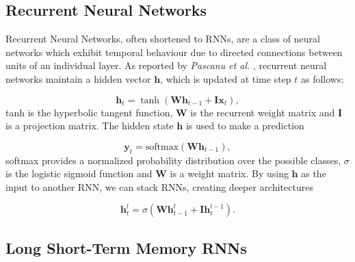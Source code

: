 \documentclass[article]{IEEEtran}
\begin{document}
\subsection{Recurrent Neural Networks}
\def\x{{\mathbf x}}
\def\L{{\cal L}}
Recurrent Neural Networks, often shortened to RNNs, are a class of neural networks which exhibit temporal behaviour due to directed connections between units of an individual layer. As reported by \textit{Pascanu et al.} \cite{pascanu2013construct}, recurrent neural networks maintain a hidden vector $\mathbf h$, which is updated at time step $t$ as follows:
 
\begin{equation}
	\mathbf h_t = \tanh(\mathbf W\mathbf h_{t-1} + \mathbf I\mathbf  \x_t),
\end{equation}
tanh is the hyperbolic tangent function, $\mathbf W$ is the recurrent weight matrix and $\mathbf I$ is a projection matrix. The hidden state $\mathbf h$ is  used to make a prediction

\begin{equation}
	\mathbf y_t = \text{softmax}(\mathbf W\mathbf h_{t-1}),
\end{equation}
softmax provides a normalized probability distribution over the possible classes, $\sigma$ is the logistic sigmoid function and $\mathbf W$ is a weight matrix. By using $\mathbf h$ as the input to another RNN, we can stack RNNs, creating deeper architectures 

\begin{equation}
	\mathbf h_t^{l} = \sigma(\mathbf W\mathbf h_{t-1}^{l} + \mathbf I\mathbf h_t^{l-1}).
\end{equation}

\subsection{Long Short-Term Memory RNNs}
\def\x{{\mathbf x}}
\end{document}
